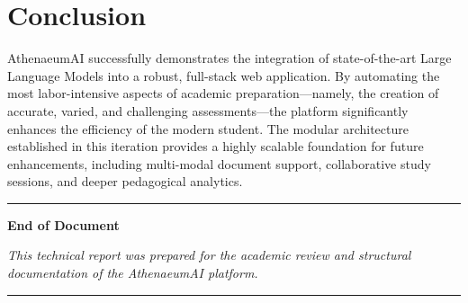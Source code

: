 \documentclass[12pt,a4paper]{article}
\begin{document}
\section{Conclusion}
AthenaeumAI successfully demonstrates the integration of state-of-the-art Large Language Models into a robust, full-stack web application. By automating the most labor-intensive aspects of academic preparation—namely, the creation of accurate, varied, and challenging assessments—the platform significantly enhances the efficiency of the modern student. The modular architecture established in this iteration provides a highly scalable foundation for future enhancements, including multi-modal document support, collaborative study sessions, and deeper pedagogical analytics.

\newpage
\thispagestyle{empty}
\vspace*{8cm}
\begin{center}
    \rule{0.4\textwidth}{1pt}\par
    \vspace{0.5cm}
    {\Large \bfseries \textcolor{primary}{End of Document}\par}
    \vspace{0.5cm}
    {\itshape This technical report was prepared for the academic review and structural documentation of the AthenaeumAI platform.\par}
    \vspace{1cm}
    \rule{0.4\textwidth}{1pt}\par
\end{center}
\end{document}
